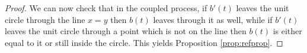 {\begin{proof}

We can now check that in the coupled process, if $b'(t)$ leaves the
unit circle through the line $x=y$ then $b(t)$ leaves through it as
well, while if $b'(t)$ leaves the unit circle through a point which
is not on the line then $b(t)$ is either equal to it or still inside
the circle. This yields Proposition \ref{prop:refprop}.
 
%
\end{proof}
}

